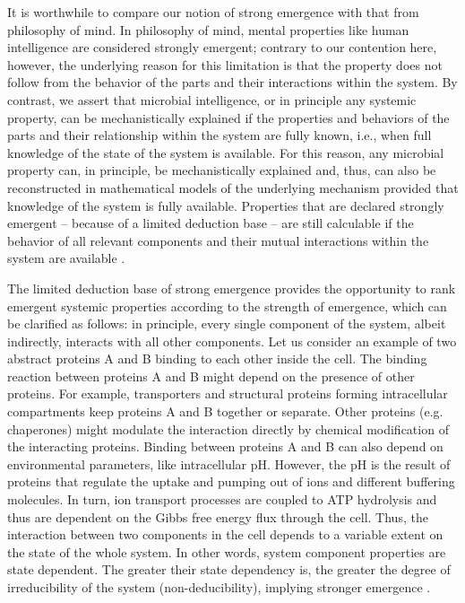 It is worthwhile to compare our notion of strong emergence with that from philosophy of mind. In philosophy of mind, mental properties like human intelligence are considered strongly emergent; contrary to our contention here, however, the underlying reason for this limitation is that the property does not follow from the behavior of the parts and their interactions within the system. By contrast, we assert that microbial intelligence, or in principle any systemic property, can be mechanistically explained if the properties and behaviors of the parts and their relationship within the system are fully known, i.e., when full knowledge of the state of the system is available. For this reason, any microbial property can, in principle, be mechanistically explained and, thus, can also be reconstructed in mathematical models of the underlying mechanism provided that knowledge of the system is fully available. Properties that are declared strongly emergent – because of a limited deduction base – are still calculable if the behavior of all relevant components and their mutual interactions within the system are available \cite{boogerd_emergence_2005}.

The limited deduction base of strong emergence provides the opportunity to rank emergent systemic properties according to the strength of emergence, which can be clarified as follows: in principle, every single component of the system, albeit indirectly, interacts with all other components. Let us consider an example of two abstract proteins A and B binding to each other inside the cell. The binding reaction between proteins A and B might depend on the presence of other proteins. For example, transporters and structural proteins forming intracellular compartments keep proteins A and B together or separate. Other proteins (e.g. chaperones) might modulate the interaction directly by chemical modification of the interacting proteins. Binding between proteins A and B can also depend on environmental parameters, like intracellular pH. However, the pH is the result of proteins that regulate the uptake and pumping out of ions and different buffering molecules. In turn, ion transport processes are coupled to ATP hydrolysis and thus are dependent on the Gibbs free energy flux through the cell. Thus, the interaction between two components in the cell depends to a variable extent on the state of the whole system. In other words, system component properties are state dependent. The greater their state dependency is, the greater the degree of irreducibility of the system (non-deducibility), implying stronger emergence \cite{kolodkin_emergence_2012,kolodkin_understanding_2012}.

